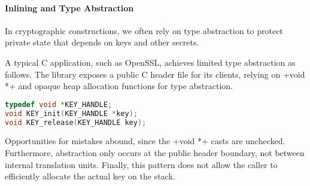 










\paragraph{Inlining and Type Abstraction} 

In cryptographic constructions, we often rely on type abstraction to
protect private state that depends on keys and other secrets.

A typical C application, such as OpenSSL, achieves limited type abstraction
as follows. The library exposes a public C header file for its clients,
relying on \li+void *+ and opaque heap allocation functions for type abstraction.
\begin{lstlisting}[numbers=none,language=C]
typedef void *KEY_HANDLE;
void KEY_init(KEY_HANDLE *key);
void KEY_release(KEY_HANDLE key);
\end{lstlisting}
Opportunities for mistakes abound, since the \li+void *+ casts are unchecked.
Furthermore, abstraction only occurs at the public header boundary, not between
internal translation units. Finally, this pattern does not allow the caller to
efficiently allocate the actual key on the stack.

